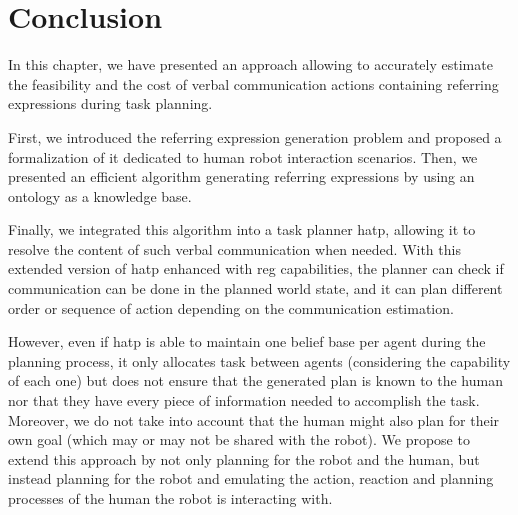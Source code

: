 \documentclass[a4paper,11pt,twoside]{StyleThese}
\begin{document}

\section{Conclusion}
In this chapter, we have presented an approach allowing to accurately estimate the feasibility and the cost of verbal communication actions containing referring expressions during task planning.

First, we introduced the referring expression generation problem and proposed a formalization of it dedicated to human robot interaction scenarios. Then, we presented an efficient algorithm generating referring expressions by using an ontology as a knowledge base.

Finally, we integrated this algorithm into a task planner \acrshort{hatp}, allowing it to resolve the content of such verbal communication when needed. With this extended version of \acrshort{hatp} enhanced with \acrshort{reg} capabilities, the planner can check if communication can be done in the planned world state, and it can plan different order or sequence of action depending on the communication estimation.

However, even if \acrshort{hatp} is able to maintain one belief base per agent during the planning process, it only allocates task between agents (considering the capability of each one) but does not ensure that the generated plan is known to the human nor that they have every piece of information needed to accomplish the task. Moreover, we do not take into account that the human might also plan for their own goal (which may or may not be shared with the robot). 
We propose to extend this approach by not only planning for the robot and the human, but instead planning for the robot and emulating the action, reaction and planning processes of the human the robot is interacting with.

\ifdefined{}
\else


\end{document}
